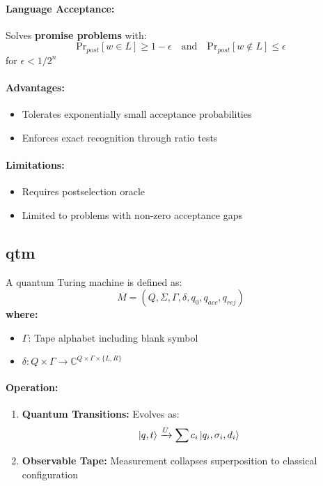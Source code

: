 \paragraph{Language Acceptance:}
Solves \textbf{promise problems} with:
\[
\text{Pr}_{post}[w \in L] \geq 1 - \epsilon \quad \text{and} \quad \text{Pr}_{post}[w \notin L] \leq \epsilon
\]
for $\epsilon < 1/2^n$

\paragraph{Advantages:}
\begin{itemize}
    \item Tolerates exponentially small acceptance probabilities
    \item Enforces exact recognition through ratio tests
\end{itemize}

\paragraph{Limitations:}
\begin{itemize}
    \item Requires postselection oracle
    \item Limited to problems with non-zero acceptance gaps
\end{itemize}

\subsection{\acrfull{qtm}}
\label{subsec:qtm}

\begin{definition}
A quantum Turing machine is defined as:
\[
M = (Q, \Sigma, \Gamma, \delta, q_0, q_{acc}, q_{rej})
\]
\textbf{where:}
\begin{itemize}
    \item $\Gamma$: Tape alphabet including blank symbol
    \item $\delta: Q \times \Gamma \rightarrow \mathbb{C}^{Q \times \Gamma \times \{L,R\}}$
\end{itemize}
\end{definition}

\paragraph{Operation:}
\begin{enumerate}
    \item \textbf{Quantum Transitions:} Evolves as:
    \[
    \ket{q,t} \xrightarrow{U} \sum c_i \ket{q_i,\sigma_i,d_i}
    \]
    \item \textbf{Observable Tape:} Measurement collapses superposition to classical configuration
\end{enumerate}

